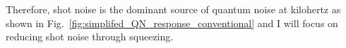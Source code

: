 Therefore, shot noise is the dominant source of quantum noise at kilohertz as shown in Fig.~\ref{fig:simplifed_QN_response_conventional} and I will focus on reducing shot noise through squeezing.



